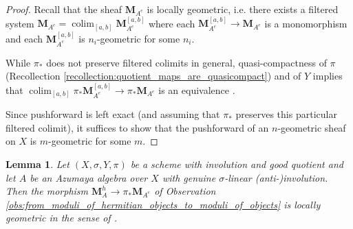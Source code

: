 \documentclass{article}
\DeclareMathOperator*{\colim}{\ensuremath{\operatorname{colim}}}
\newtheorem{lemma}[equation]{Lemma}
\theoremstyle{definition}
\begin{document}
\begin{proof}
    Recall \cite[Theorem 5.8]{MR3190610} that the sheaf $ \mathbf{M}_{A^e} $ is locally geometric, i.e. there exists a filtered system $ \mathbf{M}_{A^e} = \colim_{[a,b]} \mathbf{M}_{A^e}^{[a,b]} $ where each $ \mathbf{M}_{A^e}^{[a,b]} \to \mathbf{M}_{A^e} $ is a monomorphism and each $ \mathbf{M}_{A^e}^{[a,b]} $ is $ n_i $-geometric for some $ n_i $. 

    While $ \pi_* $ does not preserve filtered colimits in general, quasi-compactness of $ \pi $ (Recollection \ref{recollection:quotient_maps_are_quasicompact}) and of $ Y $ implies that $ \colim_{[a,b]} \pi_* \mathbf{M}_{A^e}^{[a,b]} \to \pi_*\mathbf{M}_{A^e} $ is an equivalence \cite[\S3.1.2]{Thomason_Trobaugh}. 

    Since pushforward is left exact (and assuming that $ \pi_* $ preserves this particular filtered colimit), it suffices to show that the pushforward of an $ n $-geometric sheaf on $ X $ is $ m $-geometric for some $ m $. 
\end{proof}
\begin{lemma}\label{lemma:hermitian_moduli_to_ordinary_moduli_is_geometric}
    Let $ (X,\sigma, Y,\pi) $ be a scheme with involution and good quotient and let $ A $ be an Azumaya algebra over $ X $ with genuine $ \sigma $-linear (anti-)involution. 
    Then the morphism $ \mathbf{M}^h_A \to \pi_* \mathbf{M}_{A^e} $ of Observation \ref{obs:from_moduli_of_hermitian_objects_to_moduli_of_objects} is locally geometric in the sense of \cite[\S4.3]{MR3190610}. 
\end{lemma}
\end{document}
